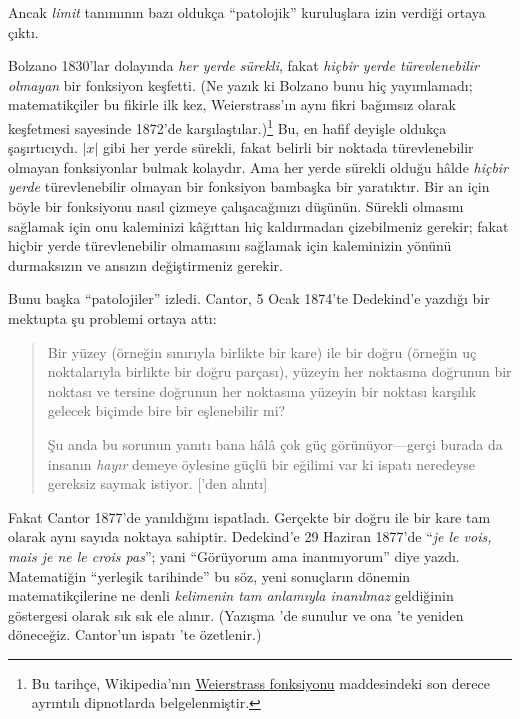 


Ancak \emph{limit} tanımının bazı oldukça ``patolojik'' kuruluşlara izin
verdiği ortaya çıktı.

Bolzano 1830'lar dolayında \emph{her yerde sürekli}, fakat \emph{hiçbir yerde
türevlenebilir olmayan} bir fonksiyon keşfetti. (Ne yazık ki Bolzano bunu hiç
yayımlamadı; matematikçiler bu fikirle ilk kez, Weierstrass'ın aynı fikri
bağımsız olarak keşfetmesi sayesinde 1872'de karşılaştılar.)\footnote{Bu
tarihçe, Wikipedia'nın
\href{http://en.wikipedia.org/wiki/Weierstrass_function}{Weierstrass
fonksiyonu} maddesindeki son derece ayrıntılı dipnotlarda belgelenmiştir.}
Bu, en hafif deyişle oldukça şaşırtıcıydı. $|x|$ gibi her yerde sürekli,
fakat belirli bir noktada türevlenebilir olmayan fonksiyonlar bulmak kolaydır.
Ama her yerde sürekli olduğu hâlde \emph{hiçbir yerde} türevlenebilir olmayan
bir fonksiyon bambaşka bir yaratıktır. Bir an için böyle bir fonksiyonu nasıl
çizmeye çalışacağınızı düşünün. Sürekli olmasını sağlamak için onu kaleminizi
kâğıttan hiç kaldırmadan çizebilmeniz gerekir; fakat hiçbir yerde
türevlenebilir olmamasını sağlamak için kaleminizin yönünü durmaksızın ve
ansızın değiştirmeniz gerekir.

Bunu başka ``patolojiler'' izledi. Cantor, 5 Ocak 1874'te Dedekind'e yazdığı
bir mektupta şu problemi ortaya attı:
\begin{quote}
Bir yüzey (örneğin sınırıyla birlikte bir kare) ile bir doğru (örneğin uç
noktalarıyla birlikte bir doğru parçası), yüzeyin her noktasına doğrunun bir
noktası ve tersine doğrunun her noktasına yüzeyin bir noktası karşılık
gelecek biçimde bire bir eşlenebilir mi?

Şu anda bu sorunun yanıtı bana hâlâ çok güç görünüyor---gerçi burada da
insanın \emph{hayır} demeye öylesine güçlü bir eğilimi var ki ispatı neredeyse
gereksiz saymak istiyor. [\citealt{Gouvea2011}'den alıntı]
\end{quote}
Fakat Cantor 1877'de yanıldığını ispatladı. Gerçekte bir doğru ile bir kare
tam olarak aynı sayıda noktaya sahiptir. Dedekind'e 29 Haziran 1877'de
``\emph{je le vois, mais je ne le crois pas}''; yani ``Görüyorum ama
inanmıyorum'' diye yazdı. Matematiğin ``yerleşik tarihinde'' bu söz, yeni
sonuçların dönemin matematikçilerine ne denli \emph{kelimenin tam anlamıyla
inanılmaz} geldiğinin göstergesi olarak sık sık ele alınır. (Yazışma
\citet{Gouvea2011}'de sunulur ve ona 'te
yeniden döneceğiz. Cantor'un ispatı 'te
özetlenir.)


